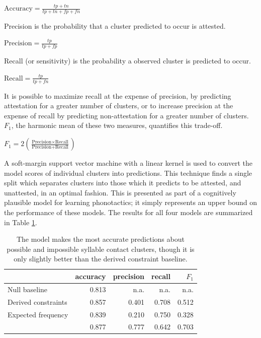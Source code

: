 \begin{unlabeledexample}
$\displaystyle \textrm{Accuracy} = \frac{tp + tn}{tp + tn + fp + fn}$
\end{unlabeledexample}

\noindent Precision is the probability that a cluster predicted to occur is attested.

\begin{unlabeledexample}
$\displaystyle \textrm{Precision} = \frac{tp}{tp + fp}$
\end{unlabeledexample}

\noindent Recall (or sensitivity) is the probability a observed cluster is predicted to occur.

\begin{unlabeledexample}
$\displaystyle \textrm{Recall} = \frac{tp}{tp + fn}$
\end{unlabeledexample}

\noindent It is possible to maximize recall at the expense of precision, by predicting attestation for a greater number of clusters, or to increase precision at the expense of recall by predicting non-attestation for a greater number of clusters. $F_1$, the harmonic mean of these two measures, quantifies this trade-off.  

\begin{unlabeledexample}
$\displaystyle F_1 = 2 \left( \frac{\textrm{Precision} \times \textrm{Recall}}{\textrm{Precision} + \textrm{Recall}}\right)$
\end{unlabeledexample}

A soft-margin support vector machine \citep{Cortes1995} with a linear kernel is used to convert the model scores of individual clusters into predictions. This technique finds a single split which separates clusters into those which it predicts to be attested, and unattested, in an optimal fashion. This is presented as part of a cognitively plausible model for learning phonotactics; it simply represents an upper bound on the performance of these models. The results for all four models are summarized in Table \ref{cmresults}.

\begin{table} \centering
\begin{tabular}{l | r r r r}
\toprule
                          & accuracy & precision & recall & $F_1$ \\ 
\midrule
Null baseline             & 0.813    & n.a.      & n.a.   & n.a.  \\
Derived constraints       & 0.857    & 0.401     & 0.708  & 0.512 \\
Expected frequency        & 0.839    & 0.210     & 0.750  & 0.328 \\
\citet{Hayes2008a}        & 0.877    & 0.777     & 0.642  & 0.703 \\
\bottomrule
\end{tabular}
\caption{The \citeauthor{Hayes2008a} model makes the most accurate predictions about possible and impossible syllable contact clusters, though it is only slightly better than the derived constraint baseline.}
\label{cmresults}
\end{table}

